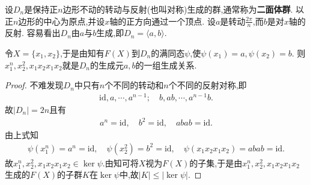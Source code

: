 \documentclass[../../main.tex]{subfiles}%
\begin{document}
\begin{proposition}
设$D_n$是保持正$n$边形不动的转动与反射(也叫对称)生成的群,通常称为\textbf{二面体群}.
以正$n$边形的中心为原点,并设$x$轴的正方向通过一个顶点. 设$a$是转动$\frac{2\pi}{n}$,而$b$是对$x$轴的反射. 容易看出$D_n$由$a$与$b$生成,即$D_n=\langle a,b\rangle.$

令$X=\{x_1,x_2\}$,于是由知有$F(X)$到$D_n$的满同态$\psi$,使$\psi(x_1)=a,\psi(x_2)=b$. 则$x_1^n,x_2^2,x_1x_2x_1x_2$就是$D_n$的生成元$a,b$的一组生成关系. 
\end{proposition}
\begin{proof}

不难发现$D_n$中只有$n$个不同的转动和$n$个不同的反射对称,即
\begin{align*}
\mathrm{id},a,\cdots ,a^{n-1};\quad b,ab,\cdots ,a^{n-1}b.
\end{align*}
故$|D_n|=2n$且有
\begin{align*}
a^n = \text{id},\quad b^2 = \text{id},\quad abab = \text{id}.
\end{align*}
由上式知
\begin{align*}
\psi \left( x_{1}^{n} \right) =a^n=\mathrm{id},\quad \psi \left( x_{2}^{2} \right) =b^2=\mathrm{id},\quad \psi \left( x_1x_2x_1x_2 \right)=abab=\mathrm{id}.
\end{align*}
故$x_1^n,x_2^2,x_1x_2x_1x_2\in \ker\psi$.由知可将$X$视为$F(X)$的子集,于是由$x_1^n,x_2^2,x_1x_2x_1x_2$生成的$F(X)$的子群$K$在$\ker \psi$中,故$|K|\leqslant |\ker\psi|.$


\end{proof}
\end{document}

